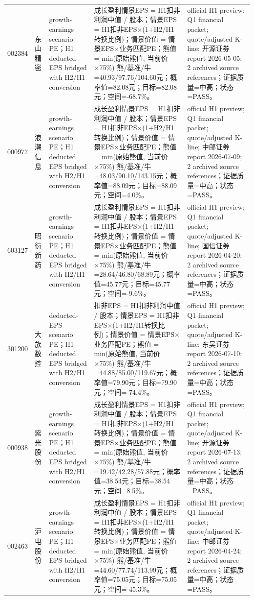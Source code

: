 \begin{longtable}{L{0.85cm}L{1.55cm}L{2.25cm}L{6.0cm}L{4.0cm}}
002384 & 东山精密 & growth-earnings scenario PE；H1 deducted EPS bridged with H2/H1 conversion & 成长盈利情景EPS = H1扣非利润中值 / 股本；情景EPS = H1扣非EPS×(1+H2/H1转换比例)；情景价值 = 情景EPS×业务匹配PE；熊值 = min(原始熊值, 当前价×75\%) 熊/基准/牛=40.93/97.76/104.60元；概率值=82.08元；目标=82.08元；空间=-68.7\%。 & official H1 preview; Q1 financial packet; quote/adjusted K-line; 开源证券 report 2026-05-05; 2 archived source references；证据质量=中高；状态=PASS。 \\
000977 & 浪潮信息 & growth-earnings scenario PE；H1 deducted EPS bridged with H2/H1 conversion & 成长盈利情景EPS = H1扣非利润中值 / 股本；情景EPS = H1扣非EPS×(1+H2/H1转换比例)；情景价值 = 情景EPS×业务匹配PE；熊值 = min(原始熊值, 当前价×75\%) 熊/基准/牛=48.03/90.10/143.15元；概率值=88.09元；目标=88.09元；空间=4.0\%。 & official H1 preview; Q1 financial packet; quote/adjusted K-line; 中邮证券 report 2026-07-09; 2 archived source references；证据质量=中高；状态=PASS。 \\
603127 & 昭衍新药 & growth-earnings scenario PE；H1 deducted EPS bridged with H2/H1 conversion & 成长盈利情景EPS = H1扣非利润中值 / 股本；情景EPS = H1扣非EPS×(1+H2/H1转换比例)；情景价值 = 情景EPS×业务匹配PE；熊值 = min(原始熊值, 当前价×75\%) 熊/基准/牛=28.64/46.80/68.89元；概率值=45.77元；目标=45.77元；空间=-9.6\%。 & official H1 preview; Q1 financial packet; quote/adjusted K-line; 国信证券 report 2026-04-20; 2 archived source references；证据质量=中高；状态=PASS。 \\
301200 & 大族数控 & deducted-EPS scenario PE；H1 deducted EPS bridged with H2/H1 conversion & 扣非EPS = H1扣非利润中值 / 股本；情景EPS = H1扣非EPS×(1+H2/H1转换比例)；情景价值 = 情景EPS×业务匹配PE；熊值 = min(原始熊值, 当前价×75\%) 熊/基准/牛=44.88/85.00/119.67元；概率值=79.90元；目标=79.90元；空间=-74.4\%。 & official H1 preview; Q1 financial packet; quote/adjusted K-line; 东吴证券 report 2026-07-10; 2 archived source references；证据质量=中高；状态=PASS。 \\
000938 & 紫光股份 & growth-earnings scenario PE；H1 deducted EPS bridged with H2/H1 conversion & 成长盈利情景EPS = H1扣非利润中值 / 股本；情景EPS = H1扣非EPS×(1+H2/H1转换比例)；情景价值 = 情景EPS×业务匹配PE；熊值 = min(原始熊值, 当前价×75\%) 熊/基准/牛=19.42/42.28/57.88元；概率值=38.54元；目标=38.54元；空间=8.5\%。 & official H1 preview; Q1 financial packet; quote/adjusted K-line; 开源证券 report 2026-07-13; 2 archived source references；证据质量=中高；状态=PASS。 \\
002463 & 沪电股份 & growth-earnings scenario PE；H1 deducted EPS bridged with H2/H1 conversion & 成长盈利情景EPS = H1扣非利润中值 / 股本；情景EPS = H1扣非EPS×(1+H2/H1转换比例)；情景价值 = 情景EPS×业务匹配PE；熊值 = min(原始熊值, 当前价×75\%) 熊/基准/牛=44.60/77.74/113.99元；概率值=75.05元；目标=75.05元；空间=-45.3\%。 & official H1 preview; Q1 financial packet; quote/adjusted K-line; 中邮证券 report 2026-04-24; 2 archived source references；证据质量=中高；状态=PASS。 \\

\end{longtable}
